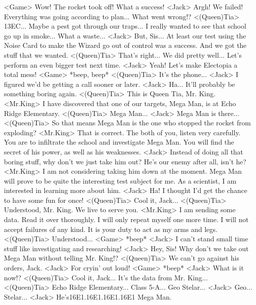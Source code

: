 <Game> Wow! The rocket took off! 
What a success! 
<Jack> Argh! We failed! 
Everything was going according to plan... What went wrong!? 
<(Queen)Tia> {13}{EC}... 
Maybe a pest got through our traps... 
I really wanted to see that school go up in smoke... 
What a waste... 
<Jack> But, Sis... 
At least our test using the Noise Card to make 
the Wizard go out of control was a success. 
And we got the stuff that we wanted. 
<(Queen)Tia> That's right... We did pretty well... 
Let's perform an even bigger test next time. 
<Jack> Yeah! Let's make Electopia a total mess! 
<Game> *beep, beep* 
<(Queen)Tia> It's the phone... 
<Jack> I figured we'd be getting a call sooner or later. 
<Jack> Ha... 
It'll probably be something boring again. 
<(Queen)Tia> This is Queen Tia, Mr. King. 
<Mr.King> I have discovered that one of our targets, Mega Man, 
is at Echo Ridge Elementary. 
<(Queen)Tia> Mega Man... 
<Jack> Mega Man is there... 
<(Queen)Tia> So that means Mega Man is the one who stopped the rocket from exploding? 
<Mr.King> That is correct. 
The both of you, listen very carefully. 
You are to infiltrate the school and investigate Mega Man. 
You will find the secret of his power, as well as his weaknesses. 
<Jack> Instead of doing all that boring stuff, why don't we just take him out? 
He's our enemy after all, isn't he? 
<Mr.King> I am not considering taking him down at the moment. 
Mega Man will prove to be quite the interesting test subject for me. 
As a scientist, I am interested in learning more about him. 
<Jack> Ha! I thought I'd get the chance to have some fun for once! 
<(Queen)Tia> Cool it, Jack... 
<(Queen)Tia> Understood, Mr. King. We live to serve you. 
<Mr.King> I am sending some data. Read it over thoroughly. 
I will only repeat myself one more time. I will not accept failures of any kind. 
It is your duty to act as my arms and legs. 
<(Queen)Tia> Understood... 
<Game> *beep* 
<Jack> I can't stand small time stuff like investigating and researching! 
<Jack> Hey, Sis! 
Why don't we take out Mega Man without telling Mr. King!? 
<(Queen)Tia> We can't go against his orders, Jack. 
<Jack> For cryin' out loud! 
<Game> *beep* 
<Jack> What is it now!? 
<(Queen)Tia> Cool it, Jack... 
It's the data from Mr. King... 
<(Queen)Tia> Echo Ridge Elementary... Class 5-A... Geo Stelar... 
<Jack> Geo... Stelar... 
<Jack> He's{16}{E1}.{16}{E1}.{16}{E1}.{16}{E1} Mega Man. 
